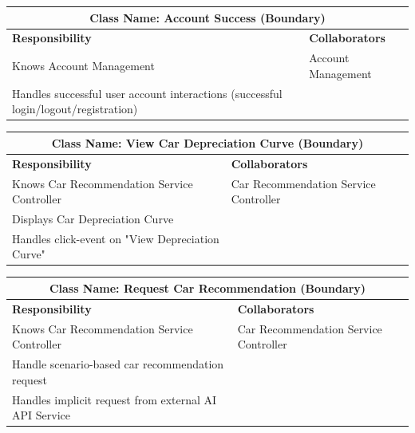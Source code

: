 \documentclass[]{article}
\begin{document}
\begin{table}[H]
  \centering
  \renewcommand{\arraystretch}{1.3} %
  \begin{tabular}{|p{7.5cm}|p{7.5cm}|}
    \hline
    \multicolumn{2}{|c|}{\textbf{Class Name: Account Success (Boundary)}}                                        \\
    \hline
    \textbf{Responsibility}                                                             & \textbf{Collaborators} \\
    \hline
    Knows Account Management                                                            & Account Management     \\
    Handles successful user account interactions (successful login/logout/registration) &                        \\
    \hline
  \end{tabular}
\end{table}
\begin{table}[H]
  \centering
  \renewcommand{\arraystretch}{1.3} %
  \begin{tabular}{|p{7.5cm}|p{7.5cm}|}
    \hline
    \multicolumn{2}{|c|}{\textbf{Class Name: View Car Depreciation Curve (Boundary)}}        \\
    \hline
    \textbf{Responsibility}                          & \textbf{Collaborators}                \\
    \hline
    Knows Car Recommendation Service Controller      & Car Recommendation Service Controller \\
    Displays Car Depreciation Curve                  &                                       \\
    Handles click-event on "View Depreciation Curve" &                                       \\
    \hline
  \end{tabular}
  \label{tab:crc_card}
\end{table}
\begin{table}[H]
  \centering
  \renewcommand{\arraystretch}{1.3} %
  \begin{tabular}{|p{7.5cm}|p{7.5cm}|}
    \hline
    \multicolumn{2}{|c|}{\textbf{Class Name: Request Car Recommendation (Boundary)}}                   \\
    \hline
    \textbf{Responsibility}                                    & \textbf{Collaborators}                \\
    \hline
    Knows Car Recommendation Service Controller                & Car Recommendation Service Controller \\
    Handle scenario-based car recommendation request           &                                       \\
    Handles implicit request from external AI API Service &                                       \\
    \hline
  \end{tabular}
  \label{tab:crc_card}
\end{table}
\end{document}
